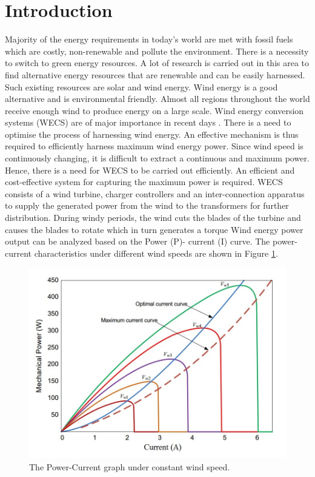 \section{Introduction}
\label{intro}
Majority of the energy requirements in today’s world are met with fossil fuels which are costly, non-renewable and pollute the environment. There is a necessity to switch to green energy resources. A lot of research is carried out in this area to find alternative energy resources that are renewable and can be easily harnessed. Such existing resources are solar and wind energy. Wind energy is a good alternative and is environmental friendly. Almost all regions throughout the world receive enough wind to produce energy on a large scale. Wind energy conversion systems (WECS) are of major importance in recent days \cite{RefJ1}. There is a  need to optimise the process of harnessing wind energy. An effective mechanism is thus required to efficiently harness maximum wind energy power. Since wind speed is continuously changing, it is difficult to extract a continuous and maximum power. Hence, there is a need for WECS to be carried out efficiently. An efficient and cost-effective system for capturing the maximum power is required. WECS consists of a wind turbine, charger controllers and an inter-connection apparatus to supply the generated power from the wind to the transformers for further distribution. During windy periods, the wind cuts the blades of the turbine and causes the blades to rotate which in turn generates a torque Wind energy power output can be analyzed based on the Power (P)- current (I) curve. The power-current characteristics under different wind speeds are shown in Figure \ref{Figure:1}.
\begin{center}
\begin{figure}
\includegraphics[width=12cm,keepaspectratio]{1.png}
\caption{The Power-Current graph under constant wind speed.\cite{RefJ2}}
\label{Figure:1}    
\end{figure}
\end{center}
